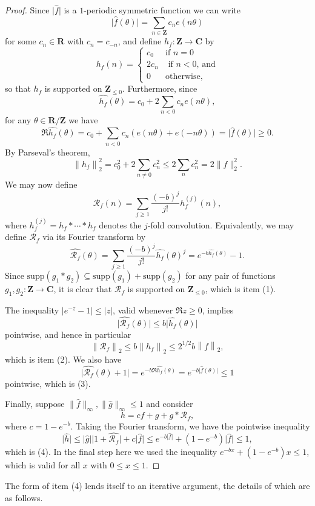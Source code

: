 \documentclass[reqno]{amsart}
\renewcommand{\leq}{\leqslant}
\renewcommand{\geq}{\geqslant}
\newcommand{\ri}{\mathcal{R}}
\newcommand{\bbz}{\mathbf{Z}}
\newcommand{\bbr}{\mathbf{R}}
\newcommand{\bbc}{\mathbf{C}}
\newcommand{\supp}{\mathrm{supp}}
\newcommand{\abs}[1]{\left\lvert #1\right\rvert}
\newcommand{\Abs}[1]{\lvert #1\rvert}
\newcommand{\norm}[1]{\left\lVert #1\right\rVert}
\numberwithin{equation}{section}
\theoremstyle{definition}
\theoremstyle{remark}
\begin{document}
\begin{proof}
Since $\Abs{\widehat{f}}$ is a $1$-periodic symmetric function we can write 
\[\Abs{\widehat{f}(\theta)}=\sum_{n\in \bbz}c_ne(n\theta)\]
for some $c_n\in \bbr$ with $c_n=c_{-n}$, and define $h_f:\bbz \to \bbc$ by
\[h_f(n) = \begin{cases} c_0&\textrm{if }n=0\\
2c_n&\textrm{ if }n<0\textrm{, and}\\
0&\textrm{otherwise,}\end{cases}\]
so that $h_f$ is supported on $\bbz_{\leq 0}$. Furthermore, since
\[\widehat{h_f}(\theta)=c_0+2 \sum_{n<0}c_ne(n\theta),\]
for any $\theta\in \bbr/\bbz$ we have
\[\Re \widehat{h_f}(\theta) = c_0+\sum_{n<0}c_n(e(n\theta)+e(-n\theta))= \Abs{\widehat{f}(\theta)} \geq 0.\]
By Parseval's theorem,
\[\norm{h_f}_2^2=c_0^2+2\sum_{n\neq 0}c_n^2\leq 2\sum_n c_n^2=2\| f\|_2^2.\]
We may now define
\[\ri_f(n) = \sum_{j\geq 1}\frac{(-b)^j}{j!} h_f^{(j)}(n),\]
where $h_f^{(j)}=h_f\ast\cdots\ast h_f$ denotes the $j$-fold convolution. Equivalently, we may define  $\ri_f$ via its Fourier transform by
\[\widehat{\ri_f}(\theta)=\sum_{j\geq 1}\frac{(-b)^j}{j!}\widehat{h_f}(\theta)^j=e^{-b\widehat{h_f}(\theta)}-1.\]
Since $\supp(g_1\ast g_2)\subseteq \supp(g_1)+\supp(g_2)$ for any pair of functions $g_1, g_2 : \bbz \rightarrow \bbc$, it is clear that $\ri_f$ is supported on $\bbz_{\leq 0}$, which is item (1). 

The inequality $\abs{e^{-z}-1}\leq \abs{z}$, valid whenever $\Re z\geq 0$, implies 
\[\Abs{\widehat{\ri_f}(\theta)} \leq b\Abs{\widehat{h_f}(\theta)}\]
pointwise, and hence in particular
\[\norm{\ri_f}_2\leq b\norm{h_f}_2\leq 2^{1/2}b\norm{f}_2,\] which is item (2).
We also have
\[\Abs{\widehat{\ri_f}(\theta)+1}= e^{-b\Re \widehat{h_f}(\theta)}=e^{-b\Abs{\widehat{f}(\theta)}}\leq 1\]
pointwise, which is (3). 

Finally, suppose $\|\widehat{f} \|_{\infty},\| \widehat{g}\|_\infty \leq 1$ and consider
\[h=cf+g+g\ast \ri_f,\] where $c = 1 - e^{-b}$.
Taking the Fourier transform, we have the pointwise inequality
\[\Abs{\widehat{h}}\leq \Abs{\widehat{g}}\Abs{1+\widehat{\ri_f}}+c\Abs{\widehat{f}}\leq e^{-b\Abs{\widehat{f}}}+(1 - e^{-b})\Abs{\widehat{f}} \leq 1,\] which is (4). 
In the final step here we used the inequality $e^{-bx}+(1 - e^{-b})x\leq 1$, which is valid for all $x$ with $0\leq x\leq 1$. 
\end{proof}

The form of item (4) lends itself to an iterative argument, the details of which are as follows.
\end{document}
